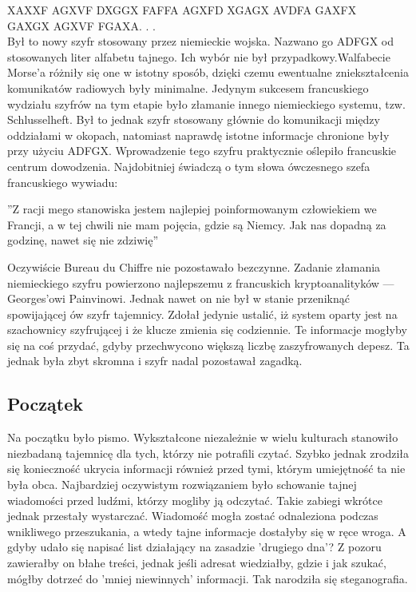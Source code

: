 \documentclass[a4paper]{article}
\begin{document}
XAXXF AGXVF DXGGX FAFFA AGXFD XGAGX AVDFA GAXFX\\
\indent GAXGX AGXVF FGAXA. . . \\

Był to nowy szyfr stosowany przez niemieckie wojska. Nazwano go ADFGX od stosowanych liter
alfabetu tajnego. Ich wybór nie był przypadkowy.Walfabecie Morse’a różniły się one w istotny sposób,
dzięki czemu ewentualne zniekształcenia komunikatów radiowych były minimalne. Jedynym
sukcesem francuskiego wydziału szyfrów na tym etapie było złamanie innego niemieckiego systemu,
tzw. Schlusselheft. Był to jednak szyfr stosowany głównie do komunikacji między oddziałami
w okopach, natomiast naprawdę istotne informacje chronione były przy użyciu ADFGX. Wprowadzenie
tego szyfru praktycznie oślepiło francuskie centrum dowodzenia. Najdobitniej świadczą o
tym słowa ówczesnego szefa francuskiego wywiadu: \\
\begin{center}
”Z racji mego stanowiska jestem najlepiej poinformowanym człowiekiem we Francji, a w tej chwili
nie mam pojęcia, gdzie są Niemcy. Jak nas dopadną za godzinę, nawet się nie zdziwię”\cite{text1}
\end{center}
Oczywiście Bureau du Chiffre nie pozostawało bezczynne. Zadanie złamania niemieckiego szyfru
powierzono najlepszemu z francuskich kryptoanalityków — Georges’owi Painvinowi. Jednak nawet
on nie był w stanie przeniknąć spowijającej ów szyfr tajemnicy. Zdołał jedynie ustalić, iż system
oparty jest na szachownicy szyfrującej i że klucze zmienia się codziennie. Te informacje mogłyby się
na coś przydać, gdyby przechwycono większą liczbę zaszyfrowanych depesz. Ta jednak była zbyt
skromna i szyfr nadal pozostawał zagadką.

\subsection{Początek}
Na początku było pismo. Wykształcone niezależnie w wielu kulturach stanowiło niezbadaną tajemnicę
dla tych, którzy nie potrafili czytać. Szybko jednak zrodziła się konieczność ukrycia informacji
również przed tymi, którym umiejętność ta nie była obca. Najbardziej oczywistym rozwiązaniem
było schowanie tajnej wiadomości przed ludźmi, którzy mogliby ją odczytać. Takie zabiegi wkrótce
jednak przestały wystarczać. Wiadomość mogła zostać odnaleziona podczas wnikliwego przeszukania,
a wtedy tajne informacje dostałyby się w ręce wroga. A gdyby udało się napisać list działający
na zasadzie ’drugiego dna’? Z pozoru zawierałby on błahe treści, jednak jeśli adresat wiedziałby,
gdzie i jak szukać, mógłby dotrzeć do ’mniej niewinnych’ informacji. Tak narodziła się steganografia.
\end{document}
